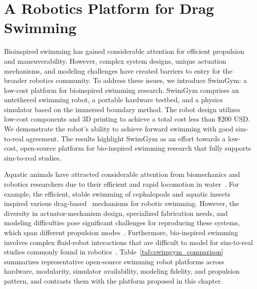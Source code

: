 \section{A Robotics Platform for Drag Swimming}

Bioinspired swimming has gained considerable attention for efficient propulsion and maneuverability. However, complex system designs, unique actuation mechanisms, and modeling challenges have created barriers to entry for the broader robotics community. To address these issues, we introduce SwimGym: a low-cost platform for bioinspired swimming research. SwimGym comprises an untethered swimming robot, a portable hardware testbed, and a physics simulator based on the immersed boundary method. The robot design utilizes low-cost components and 3D printing to achieve a total cost less than \$200 USD. We demonstrate the robot's ability to achieve forward swimming with good sim-to-real agreement. The results highlight SwimGym as an effort towards a low-cost, open-source platform for bio-inspired swimming research that fully supports sim-to-real studies.
 
 
 
Aquatic animals have attracted considerable attention from biomechanics and robotics researchers due to their efficient and rapid locomotion in water~\cite{breder1926locomotion, Fish2014, van2019scaling, zhu2019tuna, Prakash_2024, wang2020development}. For example, the efficient, stable swimming of cephalopods and aquatic insects inspired various drag-based~\cite{kim2024development, kwak2023development, kwak2017design, hu2024design} mechanisms for robotic swimming. However, the diversity in actuator-mechanism design, specialized fabrication needs, and modeling difficulties pose significant challenges for reproducing these systems, which span different propulsion modes~\cite{hartmann2025highly, wu2024multimodal}. Furthermore, bio-inspired swimming involves complex fluid-robot interactions that are difficult to model for sim-to-real studies commonly found in robotics~\cite{angelidis2022gazebo, lee2023aquarium}. Table~\ref{tab:swimgym_comparison} summarizes representative open-source swimming robot platforms across hardware, modularity, simulator availability, modeling fidelity, and propulsion pattern, and contrasts them with the platform proposed in this chapter.


